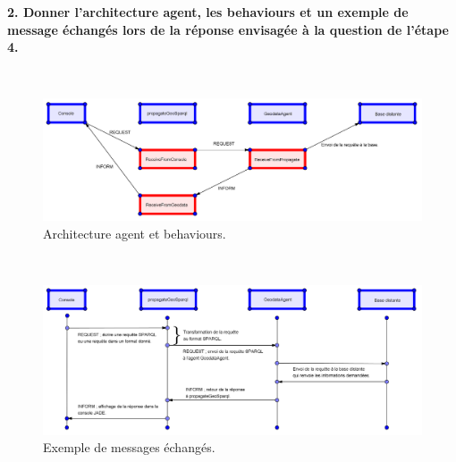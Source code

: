 \documentclass[11pt]{report}
\begin{document}
\newpage
\noindent
\textbf{2. Donner l'architecture agent, les behaviours et un exemple de message échangés lors de la réponse envisagée à la question de l'étape 4.}

~\\
\begin{figure}[h]
\centering
\includegraphics[width = \textwidth]{img/agents.png}
\caption{Architecture agent et behaviours.}
\end{figure}

~\\
\begin{figure}[h]
\centering
\includegraphics[width = \textwidth]{img/messages.png}
\caption{Exemple de messages échangés.}
\end{figure}
\end{document}

